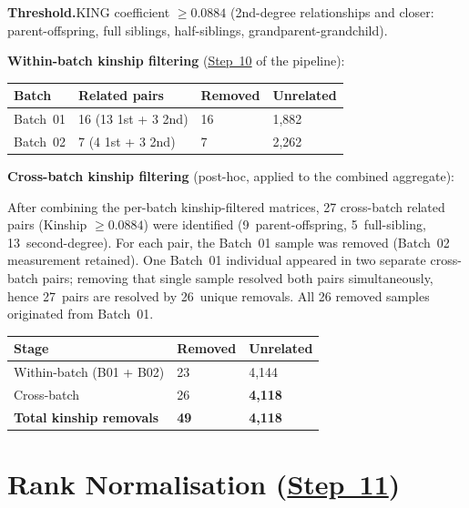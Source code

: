 \documentclass[11pt,a4paper]{article}
\begin{document}
\textbf{Threshold.}\enspace KING coefficient $\geq 0.0884$ (2nd-degree
relationships and closer: parent-offspring, full siblings, half-siblings,
grandparent-grandchild).

\textbf{Within-batch kinship filtering}
(\href{https://github.com/FINNGEN/FinnGen3-proteomics-pipeline#pipeline-steps}{Step~10}
of the pipeline):

{\footnotesize
\renewcommand{\arraystretch}{1.2}
\begin{longtable}{p{2.5cm}p{3.5cm}p{2.5cm}p{3cm}}
\toprule
\textbf{Batch} & \textbf{Related pairs}
  & \textbf{Removed} & \textbf{Unrelated} \\
\midrule
Batch~01 & 16 (13 1st + 3 2nd) & 16 & 1,882 \\
Batch~02 & 7 (4 1st + 3 2nd)   & 7  & 2,262 \\
\bottomrule
\end{longtable}
\renewcommand{\arraystretch}{1.0}
}

\textbf{Cross-batch kinship filtering} (post-hoc, applied to the combined
aggregate):

After combining the per-batch kinship-filtered matrices, 27 cross-batch
related pairs (Kinship $\geq 0.0884$) were identified
(9~parent-offspring, 5~full-sibling, 13~second-degree). For each pair, the
Batch~01 sample was removed (Batch~02 measurement retained). One Batch~01
individual appeared in two separate cross-batch pairs; removing that single
sample resolved both pairs simultaneously, hence 27~pairs are resolved by
26~unique removals. All 26 removed samples originated from Batch~01.

{\footnotesize
\renewcommand{\arraystretch}{1.2}
\begin{longtable}{p{5cm}p{3cm}p{3cm}}
\toprule
\textbf{Stage} & \textbf{Removed} & \textbf{Unrelated} \\
\midrule
Within-batch (B01 + B02) & 23 & 4,144 \\
Cross-batch & 26 & \textbf{4,118} \\
\textbf{Total kinship removals} & \textbf{49} & \textbf{4,118} \\
\bottomrule
\end{longtable}
\renewcommand{\arraystretch}{1.0}
}

\section{Rank Normalisation (\href{https://github.com/FINNGEN/FinnGen3-proteomics-pipeline#pipeline-steps}{Step~11})}
\end{document}
